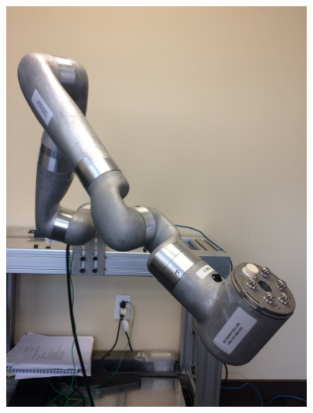 \begin{figure}
\begin{minipage}{.5\textwidth}
		\includegraphics[width=0.9\textwidth]{./images/Pose8}
		\label{fig:pose8}
	\end{minipage}
\end{figure}

